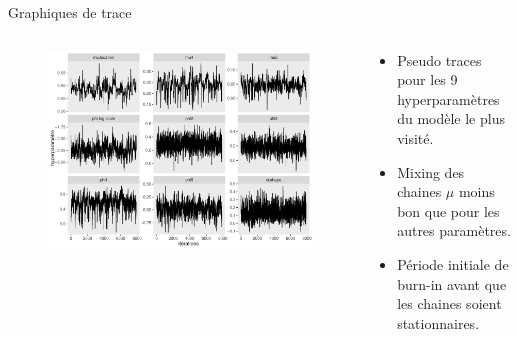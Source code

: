 \documentclass[aspectratio=169]{beamer}
\begin{document}
\begin{frame}{Graphiques de trace}
\begin{columns}
	\begin{column}{0.65\textwidth}
		\begin{figure}
		\vspace{-0.4cm}
	 		\includegraphics[height=0.9\textheight, center]{../figures/traces.pdf}
		\end{figure}
	\end{column}
	\begin{column}{0.35\textwidth}
    	\begin{itemize}
	\setlength{\itemsep}{10pt}
	\item Pseudo traces pour les 9 hyperparamètres du modèle le plus visité.
	\item Mixing des chaines $\mu$ moins bon que pour les autres paramètres.
	\item Période initiale de burn-in avant que les chaines soient stationnaires.
	\end{itemize}
	\end{column}
\end{columns}
\end{frame}
\end{document}
